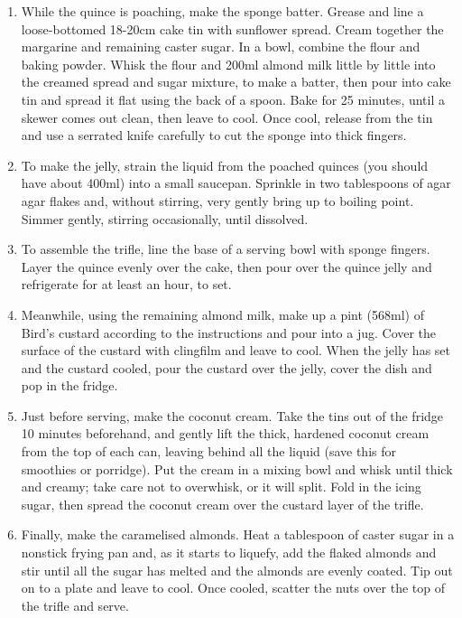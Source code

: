 \documentclass{book}
\begin{document}
\begin{enumerate}
\item While the quince is poaching, make the sponge batter. Grease and line a loose-bottomed 18-20cm cake tin with sunflower spread. Cream together the margarine and remaining caster sugar. In a bowl, combine the flour and baking powder. Whisk the flour and 200ml almond milk little by little into the creamed spread and sugar mixture, to make a batter, then pour into cake tin and spread it flat using the back of a spoon. Bake for 25 minutes, until a skewer comes out clean, then leave to cool. Once cool, release from the tin and use a serrated knife carefully to cut the sponge into thick fingers.
\item To make the jelly, strain the liquid from the poached quinces (you should have about 400ml) into a small saucepan. Sprinkle in two tablespoons of agar agar flakes and, without stirring, very gently bring up to boiling point. Simmer gently, stirring occasionally, until dissolved.
\item To assemble the trifle, line the base of a serving bowl with sponge fingers. Layer the quince evenly over the cake, then pour over the quince jelly and refrigerate for at least an hour, to set.
\item Meanwhile, using the remaining almond milk, make up a pint (568ml) of Bird’s custard according to the instructions and pour into a jug. Cover the surface of the custard with clingfilm and leave to cool. When the jelly has set and the custard cooled, pour the custard over the jelly, cover the dish and pop in the fridge.
\item Just before serving, make the coconut cream. Take the tins out of the fridge 10 minutes beforehand, and gently lift the thick, hardened coconut cream from the top of each can, leaving behind all the liquid (save this for smoothies or porridge). Put the cream in a mixing bowl and whisk until thick and creamy; take care not to overwhisk, or it will split. Fold in the icing sugar, then spread the coconut cream over the custard layer of the trifle.
\item Finally, make the caramelised almonds. Heat a tablespoon of caster sugar in a nonstick frying pan and, as it starts to liquefy, add the flaked almonds and stir until all the sugar has melted and the almonds are evenly coated. Tip out on to a plate and leave to cool. Once cooled, scatter the nuts over the top of the trifle and serve.
\end{enumerate}
\newpage
\end{document}
